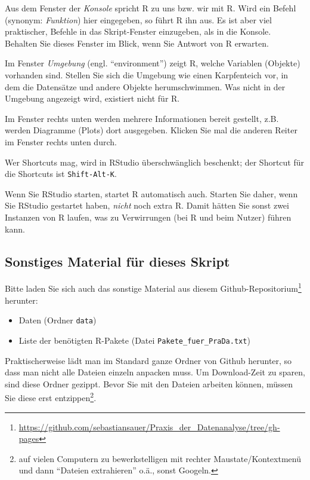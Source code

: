 \documentclass[12pt,ngerman,]{book}
\providecommand{\tightlist}{%
  \setlength{\itemsep}{0pt}\setlength{\parskip}{0pt}}
\let\rmarkdownfootnote\footnote%
\def\footnote{\protect\rmarkdownfootnote}
\renewcommand{\href}[2]{#2\footnote{\url{#1}}}
\theoremstyle{definition}
\theoremstyle{definition}
\theoremstyle{remark}
\begin{document}
Aus dem Fenster der \emph{Konsole} spricht R zu uns bzw.
wir mit R. Wird ein Befehl (synonym:
\emph{Funktion}) hier eingegeben, so führt R ihn aus. Es
ist aber viel praktischer, Befehle in das Skript-Fenster einzugeben, als
in die Konsole. Behalten Sie dieses Fenster im Blick, wenn Sie Antwort
von R erwarten.

Im Fenster \emph{Umgebung} (engl. ``environment'') zeigt
R, welche Variablen (Objekte) vorhanden sind. Stellen Sie sich die
Umgebung wie einen Karpfenteich vor, in dem die Datensätze und andere
Objekte herumschwimmen. Was nicht in der Umgebung angezeigt wird,
existiert nicht für R.

Im Fenster rechts unten werden mehrere Informationen bereit gestellt,
z.B. werden Diagramme (Plots) dort ausgegeben. Klicken Sie mal die
anderen Reiter im Fenster rechts unten durch.

Wer Shortcuts mag, wird in RStudio überschwänglich beschenkt; der
Shortcut für die Shortcuts ist \texttt{Shift-Alt-K}.

Wenn Sie RStudio starten, startet R automatisch auch. Starten Sie daher,
wenn Sie RStudio gestartet haben, \emph{nicht} noch extra R. Damit
hätten Sie sonst zwei Instanzen von R laufen, was zu Verwirrungen (bei R
und beim Nutzer) führen kann.

\subsection{Sonstiges Material für dieses
Skript}\label{sonstiges-material-fur-dieses-skript}

Bitte laden Sie sich auch das sonstige Material aus diesem
\href{https://github.com/sebastiansauer/Praxis_der_Datenanalyse/tree/gh-pages}{Github-Repositorium}
herunter:

\begin{itemize}
\tightlist
\item
  Daten (Ordner \texttt{data})
\item
  Liste der benötigten R-Pakete (Datei \texttt{Pakete\_fuer\_PraDa.txt})
\end{itemize}

Praktischerweise lädt man im Standard ganze Ordner von Github herunter,
so dass man nicht alle Dateien einzeln anpacken muss. Um Download-Zeit
zu sparen, sind diese Ordner gezippt. Bevor Sie mit den Dateien arbeiten
können, müssen Sie diese erst entzippen\footnote{auf vielen Computern zu
  bewerkstelligen mit rechter Maustate/Kontextmenü und dann ``Dateien
  extrahieren'' o.ä., sonst Googeln.}.
\end{document}
